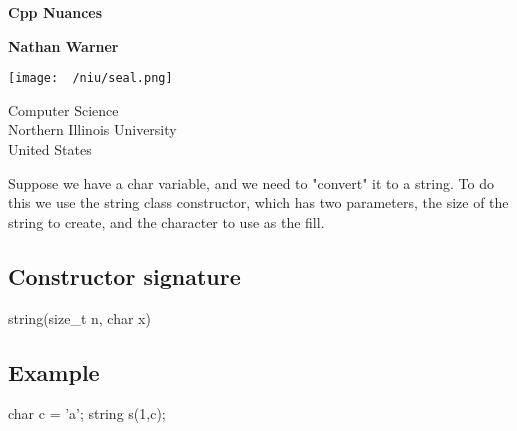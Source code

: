 \documentclass{report}
\title{\Huge{}}
\author{\huge{Nathan Warner}}
\date{\huge{}}
\begin{document}
        \begin{titlepage}
       \begin{center}
           \vspace*{1cm}
    
           \textbf{Cpp Nuances}
    
           \vspace{0.5cm}
            
                
           \vspace{1.5cm}
    
           \textbf{Nathan Warner}
    
           \vfill
                
                
           \vspace{0.8cm}
         
           \texttt{[image: ~/niu/seal.png]}
                
           Computer Science \\
           Northern Illinois University\\
           United States\\
           
                
       \end{center}
    \end{titlepage}
    \tableofcontents
    \pagebreak 
    \bigbreak \noindent 
    Suppose we have a char variable, and we need to "convert" it to a string. To do this we use the string class constructor, which has two parameters, the size of the string to create, and the character to use as the fill.
    \bigbreak \noindent 
    \subsection{Constructor signature}
    \bigbreak \noindent 
    \begin{cppcode}
    string(size_t n, char x) 
    \end{cppcode}
    \bigbreak \noindent 
    \subsection{Example}
    \bigbreak \noindent 
    \begin{cppcode}
    char c = 'a';
    string s(1,c);
    \end{cppcode}
\end{document}
